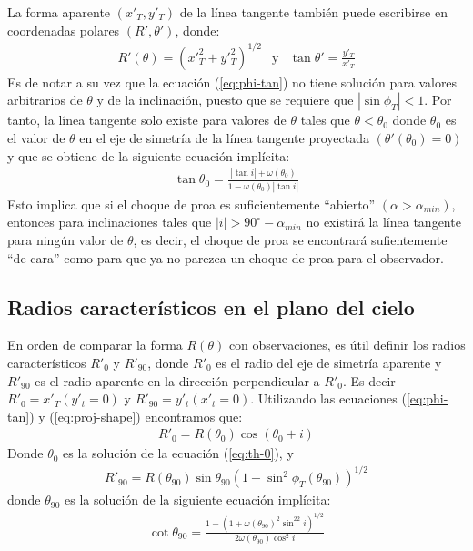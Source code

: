 La forma aparente $(x'_T, y'_T)$  de la línea tangente también puede escribirse
en coordenadas polares $(R', \theta')$, donde:
\begin{align}
  R'(\theta) = \left(x'^2_T + y'^2_T\right)^{1/2} & \mathrm{y} & \tan\theta' = \frac{y'_T}{x'_T}
  \label{eq:polar}
\end{align}
Es de notar a su vez que la ecuación (\ref{eq:phi-tan}) no tiene solución para valores
arbitrarios de $\theta$ y de la inclinación, puesto que se requiere que
$\left|\sin\phi_T\right| < 1$. Por tanto, la línea tangente solo existe para valores
de $\theta$ tales que $\theta < \theta_0$ donde $\theta_0$ es el valor de $\theta$ en
el eje de simetría de la línea tangente proyectada $(\theta'(\theta_0) = 0)$ y que se
obtiene de la siguiente ecuación implícita:
\begin{align}
  \tan\theta_0 = \frac{|\tan i| + \omega(\theta_0)}{1 - \omega(\theta_0)|\tan i|}
  \label{eq:th-0}
\end{align}
Esto implica que si el choque de proa es suficientemente ``abierto''
$(\alpha > \alpha_{min})$, entonces para inclinaciones tales que
$|i| > 90^\circ - \alpha_{min}$ no existirá la línea tangente para ningún valor de $\theta$,
es decir, el choque de proa se encontrará sufientemente ``de cara'' como para que ya no
parezca un choque de proa para el observador.

\subsection{Radios característicos en el plano del cielo}

En orden de comparar la forma $R(\theta)$ con observaciones, es útil definir los radios
característicos $R'_0$ y $R'_{90}$, donde $R'_0$ es el radio del eje de simetría aparente
y $R'_{90}$ es el radio aparente en la dirección perpendicular a $R'_0$. Es decir
$R'_0 = x'_T(y'_t=0)$ y $R'_{90} = y'_t(x'_t = 0)$. Utilizando las ecuaciones
(\ref{eq:phi-tan}) y (\ref{eq:proj-shape}) encontramos que:
\begin{align}
R'_0 = R(\theta_0)\cos(\theta_0 + i)
\label{eq:R0p}
\end{align}
Donde $\theta_0$ es la solución de la ecuación (\ref{eq:th-0}), y
\begin{align}
  R'_{90} = R(\theta_{90})\sin\theta_{90}\left(1-\sin^2\phi_T(\theta_{90})\right)^{1/2}
  \label{eq:R90p}
\end{align}
donde $\theta_{90}$ es la solución de la siguiente ecuación implícita:
\begin{align}
  \cot\theta_{90} = \frac{1 - \left(1+\omega(\theta_{90})^2\sin^22i\right)^{1/2}}
  {2\omega(\theta_{90})\cos^2i}
  \label{eq:th90}
\end{align}

